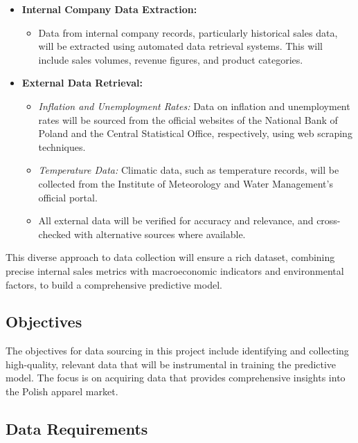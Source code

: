 \documentclass{article}
\begin{document}
\begin{itemize}
    \item \textbf{Internal Company Data Extraction:}
    \begin{itemize}
        \item Data from internal company records, particularly historical sales data, will be extracted using automated data retrieval systems. This will include sales volumes, revenue figures, and product categories.
    \end{itemize}
    
    \item \textbf{External Data Retrieval:}
    \begin{itemize}
        \item \textit{Inflation and Unemployment Rates:} Data on inflation and unemployment rates will be sourced from the official websites of the National Bank of Poland and the Central Statistical Office, respectively, using web scraping techniques.
        \item \textit{Temperature Data:} Climatic data, such as temperature records, will be collected from the Institute of Meteorology and Water Management's official portal.
        \item All external data will be verified for accuracy and relevance, and cross-checked with alternative sources where available.
    \end{itemize}
\end{itemize}

This diverse approach to data collection will ensure a rich dataset, combining precise internal sales metrics with macroeconomic indicators and environmental factors, to build a comprehensive predictive model.



\subsection{Objectives}

The objectives for data sourcing in this project include identifying and collecting high-quality, relevant data that will be instrumental in training the predictive model. The focus is on acquiring data that provides comprehensive insights into the Polish apparel market.

\subsection{Data Requirements}
\end{document}
